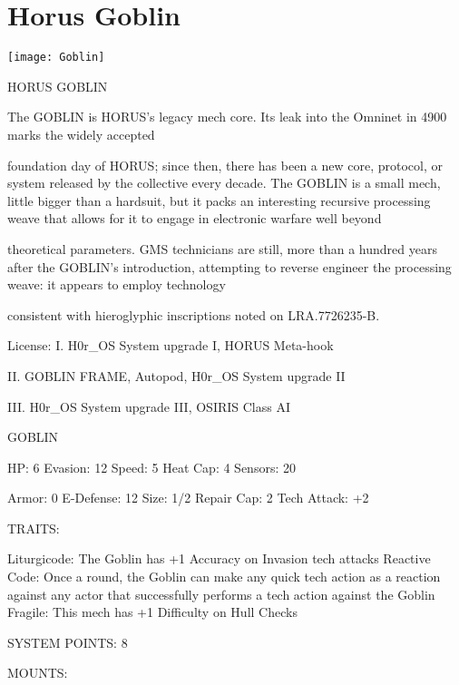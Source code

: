 \section{Horus Goblin}

\centering\texttt{[image: Goblin]}

                                          HORUS GOBLIN

The GOBLIN is HORUS’s legacy mech core. Its leak into the Omninet in 4900 marks the widely accepted

foundation day of HORUS; since then, there has been a new core, protocol, or system released by the
collective every decade. The GOBLIN is a small mech, little bigger than a hardsuit, but it packs an
interesting recursive processing weave that allows for it to engage in electronic warfare well beyond

theoretical parameters. GMS technicians are still, more than a hundred years after the GOBLIN’s
introduction, attempting to reverse engineer the processing weave: it appears to employ technology

consistent with hieroglyphic inscriptions noted on LRA.7726235-B.

                                                  License:
I. H0r\_OS System upgrade I, HORUS Meta-hook

II. GOBLIN FRAME, Autopod, H0r\_OS System upgrade II

III. H0r\_OS System upgrade III, OSIRIS Class AI


                                                  GOBLIN

  HP: 6          Evasion: 12                          Speed: 5           Heat Cap: 4       Sensors: 20

  Armor: 0       E-Defense: 12                        Size: 1/2          Repair Cap: 2     Tech Attack:
                                                                                           +2

                                                   TRAITS:

  Liturgicode: The Goblin has +1 Accuracy on Invasion tech attacks
  Reactive Code: Once a round, the Goblin can make any quick tech action as a reaction against
  any actor that successfully performs a tech action against the Goblin
  Fragile: This mech has +1 Difficulty on Hull Checks

                                            SYSTEM POINTS: 8

                                                  MOUNTS:

